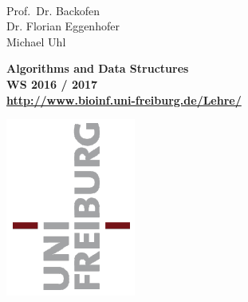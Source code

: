 \documentclass[ngerman,12pt]{article}
\begin{document}
\setlength{\textwidth}{16.5cm}
\setlength{\textheight}{22cm}
\setlength{\topmargin}{0cm}
\setlength{\oddsidemargin}{-0.3cm}
\setlength{\evensidemargin}{0cm}
\vspace*{-20mm}

\parbox{40mm}{%
\footnotesize
{}\\[0.5mm]
Prof.~Dr. Backofen\\
Dr. Florian Eggenhofer\\[0.3mm]
Michael Uhl
} %
\parbox{100mm}{\vspace*{1mm}\begin{center}\large\bf%
Algorithms and Data Structures\\[0mm]
WS 2016 / 2017\\[0mm]%
{\footnotesize\rm \url{http://www.bioinf.uni-freiburg.de/Lehre/}}%
\end{center}}
\par\vspace{-5mm}
\vspace*{2mm}
\raisebox{1.19cm}{%
\textcolor{freiburg-gray}{\rule{0.885\textwidth}{1.1mm}}}
\par\vspace*{-37.84mm}
\hspace*{\fill}\includegraphics[scale=0.49]{uni_logo.png}
\par\vspace{-5mm}
\end{document}
